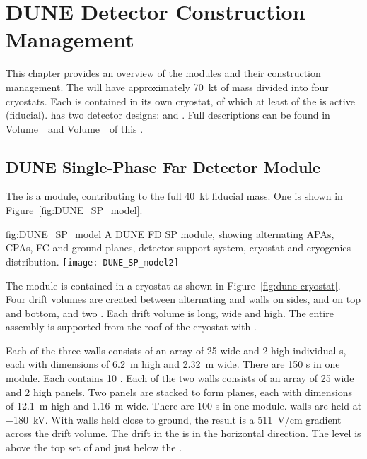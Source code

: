 \chapter{DUNE Detector Construction Management}
\label{vl:tc-dune_overview}


This chapter provides an overview of
the   modules and their construction
management. The  will have approximately \SI{70}{kt} of    mass divided into four cryostats. Each  is contained in
its own   \larmass{} cryostat, of which at least \nominalmodsize of the  is active (fiducial).  has two detector designs:
 and .  Full descriptions can be found in
 Volume~\volnumbersp\ and Volume~\volnumberdp\
of this  .

\section{DUNE Single-Phase Far Detector Module}
\label{sec:fdsp-SP-module}

The   is a \nominalmodsize module,
contributing to the full \SI{40}{\kilo\tonne}  fiducial
mass.  One \nominalmodsize \dword{spmod} is shown in
Figure~\ref{fig:DUNE_SP_model}.
\begin{dunefigure}
{fig:DUNE_SP_model} 
{A \nominalmodsize DUNE FD SP module, showing alternating APAs,
    CPAs, FC and ground planes, detector support system, cryostat
    and cryogenics distribution.}
  \texttt{[image: DUNE\_SP\_model2]}
\end{dunefigure} 

The module is contained in a cryostat as shown in
Figure~\ref{fig:dune-cryostat}.  Four drift volumes are created
between alternating  and  walls on sides,
 and  on top and bottom, and two .
Each drift volume is \sptpclen long, \spmaxdrift wide and \tpcheight
high.  The entire assembly is supported from the roof of the cryostat
with \dword{dss}.

Each of the three  walls consists of an array of \num{25}
wide and \num{2} high individual s, each with dimensions of
\SI{6.2}{\meter} high and \SI{2.32}{\meter} wide. There are \num{150}
s in one module. Each \dword{apa} contains \num{10}
. Each of the two  walls consists of an array of
\num{25} wide and \num{2} high \dword{cpa} panels. Two panels are
stacked to form planes, each with dimensions of \SI{12.1}{\meter} high
and \SI{1.16}{\meter} wide. There are \num{100} s in one
module.  \dword{cpa} walls are held at $-$\SI{180}{\kilo\volt}. With
\dword{apa} walls held close to ground, the result is a
\SI{511}{\volt/\centi\meter} gradient across the drift volume. The
drift in the \dword{spmod} is in the horizontal direction. The
 level is above the top set of  and just below
the \dword{dss}.

